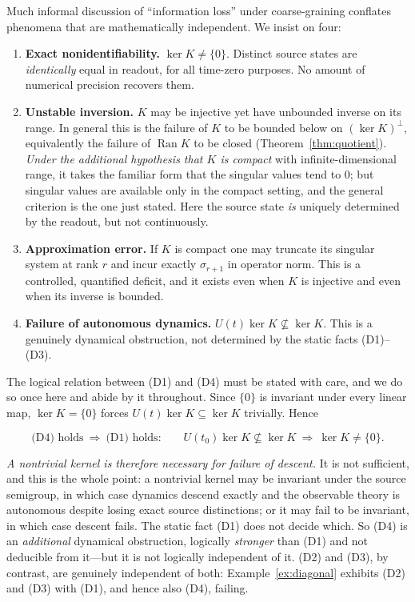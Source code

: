\documentclass[11pt,reqno]{amsart}
\numberwithin{equation}{section}
\theoremstyle{plain}
\theoremstyle{definition}
\theoremstyle{remark}
\newcommand{\Ran}{\operatorname{Ran}}
\begin{document}
Much informal discussion of ``information loss'' under coarse-graining conflates
phenomena that are mathematically independent. We insist on four:

\begin{enumerate}
\item[(D1)] \textbf{Exact nonidentifiability.} $\ker K\neq\{0\}$. Distinct source states
are \emph{identically} equal in readout, for all time-zero purposes. No amount of
numerical precision recovers them.
\item[(D2)] \textbf{Unstable inversion.} $K$ may be injective yet have unbounded inverse on
its range. In general this is the failure of $K$ to be bounded below on $(\ker K)^{\perp}$,
equivalently the failure of $\Ran K$ to be closed (Theorem~\ref{thm:quotient}). \emph{Under
the additional hypothesis that $K$ is compact} with infinite-dimensional range, it takes the
familiar form that the singular values tend to $0$; but singular values are available only in
the compact setting, and the general criterion is the one just stated. Here the source state
\emph{is} uniquely determined by the readout, but not continuously.
\item[(D3)] \textbf{Approximation error.} If $K$ is compact one may truncate its singular
system at rank $r$ and incur exactly $\sigma_{r+1}$ in operator norm. This is a controlled,
quantified deficit, and it exists even when $K$ is injective and even when its inverse is
bounded.
\item[(D4)] \textbf{Failure of autonomous dynamics.} $U(t)\ker K\not\subseteq\ker K$. This
is a genuinely dynamical obstruction, not determined by the static facts (D1)--(D3).
\end{enumerate}

The logical relation between (D1) and (D4) must be stated with care, and we do so once here
and abide by it throughout. Since $\{0\}$ is invariant under every linear map, $\ker K=\{0\}$
forces $U(t)\ker K\subseteq\ker K$ trivially. Hence

\begin{equation}
\label{eq:D1D4}
\text{(D4) holds}\ \Longrightarrow\ \text{(D1) holds:}
\qquad
U(t_{0})\ker K\not\subseteq\ker K\ \Longrightarrow\ \ker K\neq\{0\} .
\end{equation}

\emph{A nontrivial kernel is therefore necessary for failure of descent.} It is not
sufficient, and this is the whole point: a nontrivial kernel may be invariant under the source
semigroup, in which case dynamics descend exactly and the observable theory is autonomous
despite losing exact source distinctions; or it may fail to be invariant, in which case
descent fails. The static fact (D1) does not decide which. So (D4) is an \emph{additional}
dynamical obstruction, logically \emph{stronger} than (D1) and not deducible from it---but it
is not logically independent of it. (D2) and (D3), by contrast, are genuinely independent of
both: Example~\ref{ex:diagonal} exhibits (D2) and (D3) with (D1), and hence also (D4),
failing.
\end{document}
